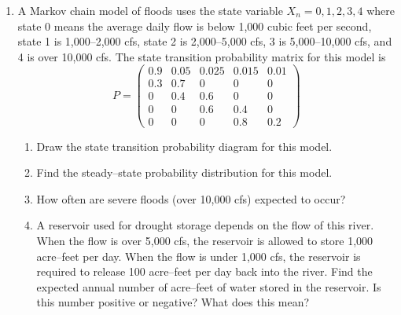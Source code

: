 \documentclass[12pt, oneside]{book}
\newenvironment{solution}{\textit{Solution.}}
\newcommand{\sol}[1]{
    \begin{customframedproof}[linecolor=orangehdx!75,]
        \begin{solution}
        #1
        \end{solution}
    \end{customframedproof}
}
\begin{document}
\begin{enumerate}
        \item A Markov chain model of floods uses the state variable \(X_{n} = 0, 1,2,3,4\) where state 0 means the average daily flow is below 1,000 cubic feet per second, state 1 is 1,000--2,000 cfs, state 2 is 2,000--5,000 cfs, 3 is 5,000--10,000 cfs, and 4 is over 10,000 cfs. The state transition probability matrix for this model is
        \[
            P = \begin{pmatrix}
                0.9 & 0.05 & 0.025 & 0.015 & 0.01 \\
                0.3 & 0.7 & 0 & 0 & 0 \\
                0 & 0.4 & 0.6 & 0 & 0 \\
                0 & 0 & 0.6 & 0.4 & 0 \\
                0 & 0 & 0 & 0.8 & 0.2
            \end{pmatrix}
        \]
        \begin{enumerate}
            \item Draw the state transition probability diagram for this model.
            \item Find the steady–state probability distribution for this model.
            \item How often are severe floods (over 10,000 cfs) expected to occur?
            \item A reservoir used for drought storage depends on the flow of this river. When the flow is over 5,000 cfs, the reservoir is allowed to store 1,000 acre--feet per day. When the flow is under 1,000 cfs, the reservoir is required to release 100 acre--feet per day back into the river. Find the expected annual number of acre--feet of water stored in the reservoir. Is this number positive or negative? What does this mean?
        \end{enumerate}



\end{enumerate}
\end{document}
